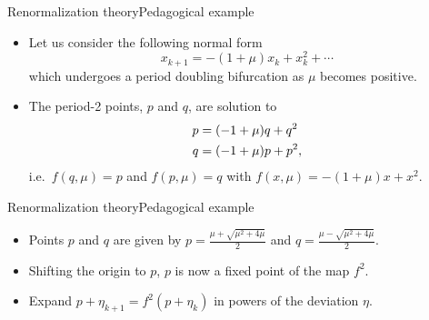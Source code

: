 \documentclass[usenames,dvipsnames,svgnames,10pt,aspectratio=169]{beamer}
\begin{document}
\begin{frame}[t, c]{Renormalization theory}{Pedagogical example}
	\begin{itemize}
		\item Let us consider the following normal form
		$$x_{k+1} = -(1 + \mu) x_k + x_k^2 + \cdots$$
		which undergoes a period doubling bifurcation as $\mu$ becomes positive.

		\bigskip

		\item The period-2 points, $p$ and $q$, are solution to
		\begin{equation}
			\begin{aligned}
				p & = (-1 + \mu)q + q^2 \\
				q & = (-1 + \mu)p + p^2,
			\end{aligned}
			\notag
		\end{equation}
		i.e.\ $f(q, \mu) = p$ and $f(p, \mu)= q$ with $f(x, \mu) = -(1 + \mu)x + x^2$.
	\end{itemize}
	\vspace{1cm}
\end{frame}

\begin{frame}[t, c]{Renormalization theory}{Pedagogical example}
	\begin{itemize}
		\item Points $p$ and $q$ are given by
		$p = \displaystyle \frac{\mu + \sqrt{\mu^2 + 4\mu}}{2}$ and $q = \displaystyle \frac{\mu - \sqrt{\mu^2 + 4\mu}}{2}$.

		\bigskip

		\item Shifting the origin to $p$, $p$ is now a fixed point of the map $f^2$.

		\bigskip

		\item Expand $p + \eta_{k+1} = f^2 (p + \eta_k)$ in powers of the deviation $\eta$.
	\end{itemize}

	\vspace{1cm}
\end{frame}
\end{document}
